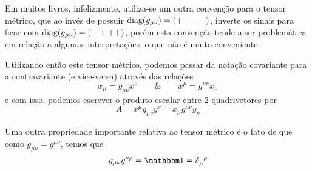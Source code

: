 \begin{note}{}
    Em muitos livros, infelizmente, utiliza-se um outra convenção para o tensor métrico, que ao invés de possuir $\text{diag}\qty(g_{\mu\nu}) = (+ - - -)$, inverte os sinais para ficar com $\text{diag}\qty(g_{\mu\nu}) = (- + + +)$, porém esta convenção tende a ser problemática em relação a algumas interpretações, o que não é muito conveniente.
\end{note}

Utilizando então este tensor métrico, podemos passar da notação covariante para a contravariante (e vice-versa) através das relações
    \begin{equation*}
        x_{\mu} = g_{\mu\nu}x^{\nu} \qquad \& \qquad 
        x^{\mu} = g^{\mu\nu}x_{\nu}
    \end{equation*}
e com isso, podemos escrever o produto escalar entre 2 quadrivetores por
    \begin{equation*}
        A = x^{\mu}g_{\mu\nu}y^{\nu} = x_{\mu}g^{\mu\nu}y_{\nu}
    \end{equation*}

Uma outra propriedade importante relativa ao tensor métrico é o fato de que como $g_{\mu\nu} = g^{\mu\nu}$, temos que
    \begin{equation*}
        g_{\mu\nu}g^{\nu\rho} = \boldone = \tensor{\delta}{_{\mu}^{\rho}}
    \end{equation*}

